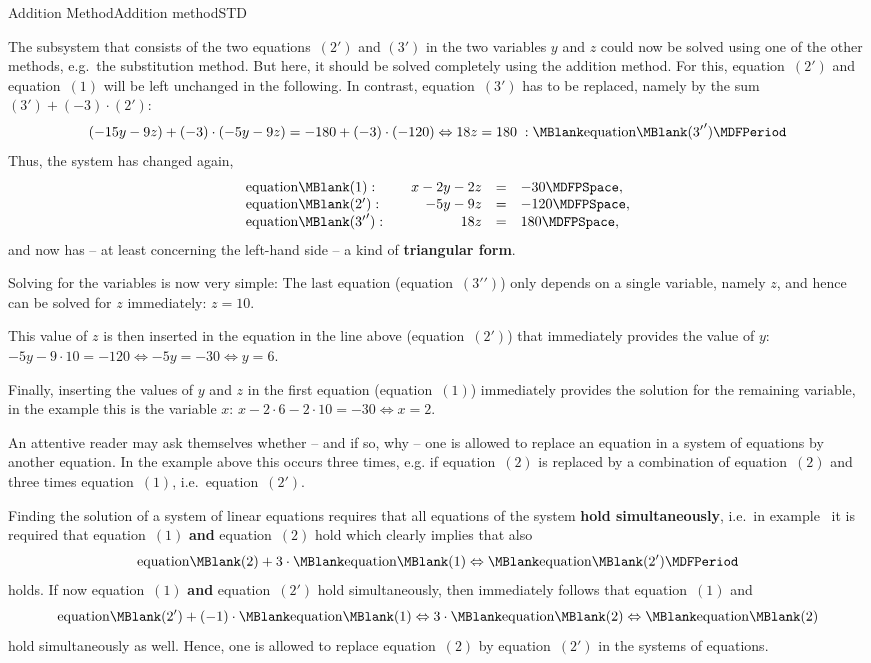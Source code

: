 \begin{MXContent}{Addition Method}{Addition method}{STD}
\begin{MExample}
The subsystem that consists of the two equations~$(2')$ and $(3')$ in the two variables 
$y$ and $z$ could now be solved using one of the other methods, e.g.\ the substitution
method. But here, it should be solved completely using the addition method. For this, 
equation~$(2')$ and equation~$(1)$ will be left unchanged in the following. In contrast,
equation~$(3')$ has to be replaced, namely by the sum $(3') + (- 3) \cdot (2')$:
$$(- 15 y - 9 z) + (- 3) \cdot (- 5 y - 9 z) = - 180 + (- 3) \cdot (- 120) \Leftrightarrow
18 z = 180 \; : \MBlank\mbox{equation}\MBlank ({3'}') \MDFPeriod $$
Thus, the system has changed again,
$$\begin{array}{lcrcl} \mbox{equation}\MBlank (1): & & x - 2 y - 2 z & = & - 30 \MDFPSpace, \\
\mbox{equation}\MBlank (2'): & & - 5 y - 9 z & = & - 120 \MDFPSpace, \\
\mbox{equation}\MBlank ({3'}'): & & 18 z & = &  180 \MDFPSpace, \end{array}$$
and now has -- at least concerning the left-hand side -- a kind of \textbf{triangular form}.

Solving for the variables is now very simple: The last equation (equation~$({3'}')$)
only depends on a single variable, namely $z$, and hence can be solved for $z$ immediately: 
$z = 10$. 

This value of $z$ is then inserted in the equation in the line above (equation~$(2')$)
that immediately provides the value of $y$: 
$- 5 y - 9 \cdot 10 = - 120 \Leftrightarrow - 5 y = - 30 \Leftrightarrow y = 6$. 

Finally, inserting the values  of $y$ and $z$ in the first equation (equation~$(1)$)
immediately provides the solution for the remaining variable, in the example this is the 
variable $x$: $x - 2 \cdot 6 - 2 \cdot 10 = - 30 \Leftrightarrow x = 2$.
\end{MExample}

An attentive reader may ask themselves whether -- and if so, why -- one is allowed 
to replace an equation in a system of equations by another equation. In the example
above this occurs three times, e.g. if equation~$(2)$ is replaced by a combination
of equation~$(2)$ and three times equation~$(1)$, i.e.\ equation~$(2')$.

Finding the solution of a system of linear equations requires that all equations 
of the system \textbf{hold simultaneously}, i.e.\ in example~
it is required that equation~$(1)$ \textbf{and} equation~$(2)$ hold which clearly implies
that also 
$$\mbox{equation}\MBlank (2) + 3 \cdot \MBlank\mbox{equation}\MBlank (1) 
\Leftrightarrow \MBlank\mbox{equation}\MBlank (2') \MDFPeriod $$
holds. If now equation~$(1)$ \textbf{and} equation~$(2')$ hold simultaneously, 
then immediately follows that equation~$(1)$ and
$$\mbox{equation}\MBlank (2') + (-1) \cdot \MBlank\mbox{equation}\MBlank (1) 
\Leftrightarrow 3\cdot\MBlank\mbox{equation}\MBlank (2) 
\Leftrightarrow \MBlank\mbox{equation}\MBlank (2)  $$
hold simultaneously as well. Hence, one is allowed to replace equation~$(2)$
by equation~$(2')$ in the systems of equations.


\end{MXContent}
